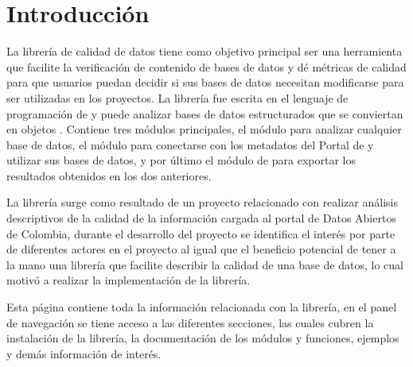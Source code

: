 \documentclass[letterpaper,10pt,openany,spanish]{sphinxmanual}
\begin{document}
\begin{figure}[htbp]
\centering

\noindent{}
\end{figure}


\chapter{Introducción}
\label{\detokenize{index:introduccion}}
La librería de calidad de datos tiene como objetivo principal ser una herramienta que facilite la verificación de contenido de bases de datos y dé métricas de calidad para que usuarios puedan decidir si sus bases de datos necesitan modificarse para ser utilizadas en los proyectos. La librería fue escrita en el lenguaje de programación de  y puede analizar bases de datos estructurados que se conviertan en objetos . Contiene tres módulos principales, el módulo {\hyperref[\detokenize{calidad_datos:calidad-datos}]{}} para analizar cualquier base de datos, el módulo {\hyperref[\detokenize{datos_gov:datos-gov}]{}} para conectarse con los metadatos del Portal de  y utilizar sus bases de datos, y por último el módulo de {\hyperref[\detokenize{reporte:reporte}]{}} para exportar los resultados obtenidos en los dos anteriores.

La librería surge como resultado de un proyecto relacionado con realizar análisis descriptivos de la calidad de la información cargada al portal de Datos Abiertos de Colombia, durante el desarrollo del proyecto se identifica el interés por parte de diferentes actores en el proyecto al igual que el beneficio potencial de tener a la mano una librería que facilite describir la calidad de una base de datos, lo cual motivó a realizar la implementación de la librería.

Esta página contiene toda la información relacionada con la librería, en el panel de navegación se tiene acceso a las diferentes secciones, las cuales cubren la instalación de la librería, la documentación de los módulos y funciones, ejemplos y demás información de interés.


\renewcommand{\indexname}{Índice de Módulos Python}
\begin{sphinxtheindex}
\let\bigletter\sphinxstyleindexlettergroup
\bigletter{c}
\item\relax{}
\indexspace
\bigletter{d}
\item\relax{}
\indexspace
\bigletter{r}
\item\relax{}
\end{sphinxtheindex}

\renewcommand{\indexname}{Índice}
\printindex
\end{document}
